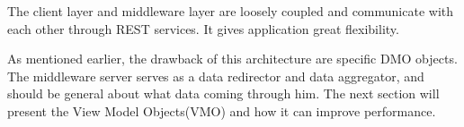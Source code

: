 The client layer and middleware layer are loosely coupled and communicate with each other through REST services. It gives application great flexibility.

As mentioned earlier, the drawback of this architecture are specific DMO objects. The middleware server serves as a data redirector and data aggregator, and should be general about what data coming through him. The next section will present the View Model Objects(VMO) and how it can improve performance.


